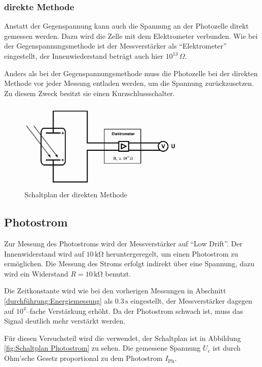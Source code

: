 \documentclass[12pt,a4paper]{scrartcl}
\numberwithin{equation}{section} %
\begin{document}
\subsubsection{direkte Methode}
\label{durchführung:direkt}

Anstatt der Gegenspannung kann auch die Spannung an der Photozelle direkt gemessen werden. Dazu wird die Zelle mit dem Elektrometer verbunden. Wie bei der Gegenspannungsmethode ist der Messverstärker als ``Elektrometer'' eingestellt, der Innenwiederstand beträgt auch hier $10^{13}\,\Omega$.

Anders als bei der Gegenspannungsmethode muss die Photozelle bei der direkten Methode vor jeder Messung entladen werden, um die Spannung zurückzusetzen. Zu diesem Zweck besitzt sie einen Kurzschlussschalter.

\begin{figure}[h!]
	\centering
	\includegraphics[width=0.7\textwidth]{../media/B1.4/Schaltplan_direkte_Methode.jpg}
	\caption{Schaltplan der direkten Methode}
	\label{fig:Schaltplan direkt}
\end{figure}

\subsection{Photostrom}

Zur Messung des Photostroms wird der Messverstärker auf ``Low Drift''. Der Innenwiderstand wird auf $10\mathrm{\,k\Omega}$ heruntergeregelt, um einen Photostrom zu ermöglichen. Die Messung des Stroms erfolgt indirekt über eine Spannung, dazu wird ein Widerstand $R=10\mathrm{\,k\Omega}$ benutzt.

Die Zeitkonstante wird wie bei den vorherigen Messungen in Abschnitt \ref{durchführung:Energiemessung} als $0.3\mathrm{\,s}$ eingestellt, der Messverstärker dagegen auf $10^4$--fache Verstärkung erhöht. Da der Photostrom schwach ist, muss das Signal deutlich mehr verstärkt werden.

Für diesen Versuchsteil wird die  verwendet, der Schaltplan ist in Abbildung \ref{fig:Schaltplan Photostrom} zu sehen. Die gemessene Spannung $U_e$ ist durch Ohm'sche Gesetz proportional zu dem Photostrom $I_\mathrm{Ph}$.
\end{document}
